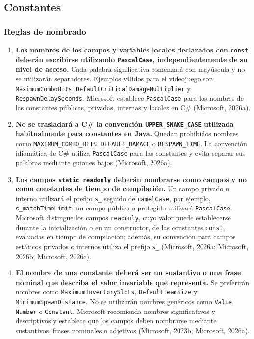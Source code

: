 \subsection{Constantes}

\subsubsection{Reglas de nombrado}

\begin{enumerate}
  \item \textbf{Los nombres de los campos y variables locales declarados con \texttt{const} deberán escribirse utilizando \texttt{PascalCase}, independientemente de su nivel de acceso.} Cada palabra significativa comenzará con mayúscula y no se utilizarán separadores. Ejemplos válidos para el videojuego son \texttt{MaximumComboHits}, \texttt{DefaultCriticalDamageMultiplier} y \texttt{RespawnDelaySeconds}. Microsoft establece \texttt{PascalCase} para los nombres de las constantes públicas, privadas, internas y locales en C\# (Microsoft, 2026a).

  \item \textbf{No se trasladará a C\# la convención \texttt{UPPER\_SNAKE\_CASE} utilizada habitualmente para constantes en Java.} Quedan prohibidos nombres como \texttt{MAXIMUM\_COMBO\_HITS}, \texttt{DEFAULT\_DAMAGE} o \texttt{RESPAWN\_TIME}. La convención idiomática de C\# utiliza \texttt{PascalCase} para las constantes y evita separar sus palabras mediante guiones bajos (Microsoft, 2026a).

  \item \textbf{Los campos \texttt{static readonly} deberán nombrarse como campos y no como constantes de tiempo de compilación.} Un campo privado o interno utilizará el prefijo \texttt{s\_} seguido de \texttt{camelCase}, por ejemplo, \texttt{s\_matchTimeLimit}; un campo público o protegido utilizará \texttt{PascalCase}. Microsoft distingue los campos \texttt{readonly}, cuyo valor puede establecerse durante la inicialización o en un constructor, de las constantes \texttt{const}, evaluadas en tiempo de compilación; además, su convención para campos estáticos privados o internos utiliza el prefijo \texttt{s\_} (Microsoft, 2026a; Microsoft, 2026b; Microsoft, 2026c).

  \item \textbf{El nombre de una constante deberá ser un sustantivo o una frase nominal que describa el valor invariable que representa.} Se preferirán nombres como \texttt{MaximumInventorySlots}, \texttt{DefaultTeamSize} y \texttt{MinimumSpawnDistance}. No se utilizarán nombres genéricos como \texttt{Value}, \texttt{Number} o \texttt{Constant}. Microsoft recomienda nombres significativos y descriptivos y establece que los campos deben nombrarse mediante sustantivos, frases nominales o adjetivos (Microsoft, 2023b; Microsoft, 2026a).


\end{enumerate}
